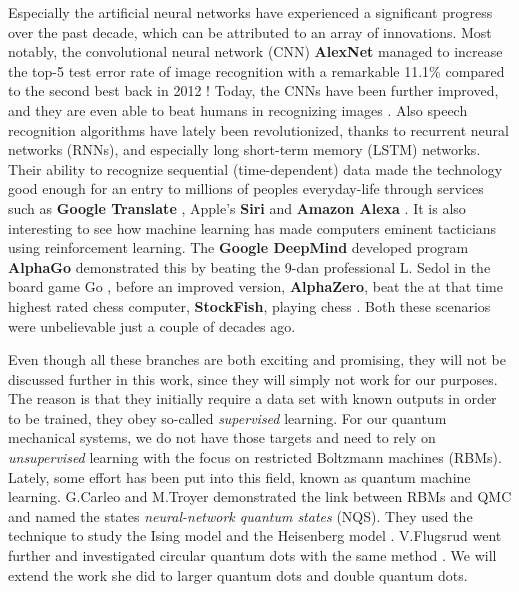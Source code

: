 Especially the artificial neural networks have experienced a significant progress over the past decade, which can be attributed to an array of innovations. Most notably, the convolutional neural network (CNN) \textbf{AlexNet}  managed to increase the top-5 test error rate of image recognition with a remarkable 11.1\% compared to the second best back in 2012 \cite{krizhevsky_imagenet_2012}! Today, the CNNs have been further improved, and they are even able to beat humans in recognizing images \cite{alom_history_2018}. Also speech recognition algorithms have lately been revolutionized, thanks to recurrent neural networks (RNNs), and especially long short-term memory (LSTM) networks. Their ability to recognize sequential (time-dependent) data made the technology good enough for an entry to millions of peoples everyday-life through services such as \textbf{Google Translate} \cite{wu_googles_2016}, Apple's \textbf{Siri} \cite{smith_ios_2016} and \textbf{Amazon Alexa} \cite{noauthor_bringing_nodate}. It is also interesting to see how machine learning has made computers eminent tacticians using reinforcement learning. The \textbf{Google DeepMind} developed program \textbf{AlphaGo} demonstrated this by beating the 9-dan professional L. Sedol in the board game Go \cite{noauthor_alphago_nodate}, before an improved version, \textbf{AlphaZero}, beat the at that time highest rated chess computer, \textbf{StockFish}, playing chess \cite{klein_mikeklein_googles_nodate}. Both these scenarios were unbelievable just a couple of decades ago.

Even though all these branches are both exciting and promising, they will not be discussed further in this work, since they will simply not work for our purposes. The reason is that they initially require a data set with known outputs in order to be trained, they obey so-called \textit{supervised} learning. For our quantum mechanical systems, we do not have those targets and need to rely on \textit{unsupervised} learning with the focus on restricted Boltzmann machines (RBMs). Lately, some effort has been put into this field, known as quantum machine learning. G.Carleo and M.Troyer demonstrated the link between RBMs and QMC and named the states \textit{neural-network quantum states} (NQS). They used the technique to study the Ising model and the Heisenberg model \cite{carleo_solving_2017}. V.Flugsrud went further and investigated circular quantum dots with the same method \cite{flugsrud_vilde_moe_solving_nodate}. We will extend the work she did to larger quantum dots and double quantum dots.

